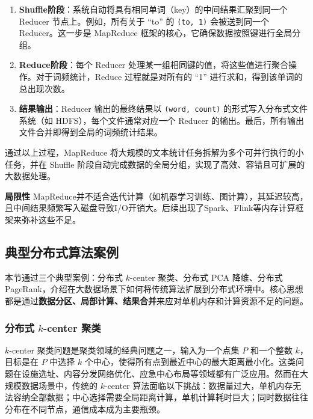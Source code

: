 \documentclass[lang=cn,newtx,10pt,scheme=chinese,chinesefont=nofont,citestyle=gb7714-2015, bibstyle=gb7714-2015]{elegantbook}
\begin{document}
\begin{refsection}
\begin{enumerate}
    \item \textbf{Shuffle阶段}：系统自动将具有相同单词（key）的中间结果汇聚到同一个 Reducer 节点上。例如，所有关于 ``to'' 的 \texttt{(to, 1)} 会被送到同一个 Reducer。这一步是 MapReduce 框架的核心，它确保数据按照键进行全局分组。
    
    \item \textbf{Reduce阶段}：每个 Reducer 处理某一组相同键的值，将这些值进行聚合操作。对于词频统计，Reduce 过程就是对所有的 ``1'' 进行求和，得到该单词的总出现次数。
    
    \item \textbf{结果输出}：Reducer 输出的最终结果以 \texttt{(word, count)} 的形式写入分布式文件系统（如 HDFS），每个文件通常对应一个 Reducer 的输出。最后，所有输出文件合并即得到全局的词频统计结果。
\end{enumerate}

通过以上过程，MapReduce 将大规模的文本统计任务拆解为多个可并行执行的小任务，并在 Shuffle 阶段自动完成数据的全局分组，实现了高效、容错且可扩展的大数据处理。






\textbf{局限性}  
MapReduce并不适合迭代计算（如机器学习训练、图计算），其延迟较高，且中间结果频繁写入磁盘导致I/O开销大。后续出现了Spark、Flink等内存计算框架来弥补这些不足。

\subsection{典型分布式算法案例}

本节通过三个典型案例：分布式 $k$-center 聚类、分布式 PCA 降维、分布式 PageRank，介绍在大数据场景下如何将传统算法扩展到分布式环境中。核心思想都是通过\textbf{数据分区、局部计算、结果合并}来应对单机内存和计算资源不足的问题。

\subsubsection{分布式 \texorpdfstring{$k$}{k}-center 聚类}

$k$-center 聚类问题是聚类领域的经典问题之一，输入为一个点集 $P$ 和一个整数 $k$，目标是在 $P$ 中选择 $k$ 个中心，使得所有点到最近中心的最大距离最小化。这类问题在设施选址、内容分发网络优化、应急中心布局等领域都有广泛应用。然而在大规模数据场景中，传统的 $k$-center 算法面临以下挑战：数据量过大，单机内存无法容纳全部数据；中心选择需要全局距离计算，单机计算耗时巨大；同时数据往往分布在不同节点，通信成本成为主要瓶颈。


\end{refsection}
\end{document}
